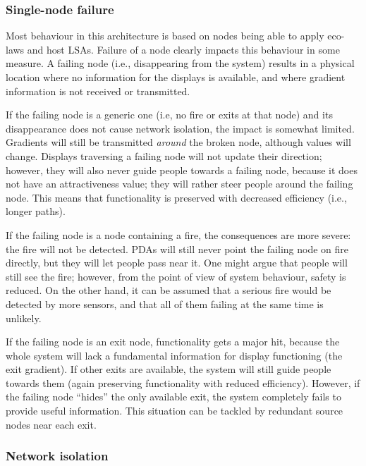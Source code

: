 \documentclass[12pt,a4paper,twoside,openright]{book}
\begin{document}
\subsubsection{Single-node failure}

Most behaviour in this architecture is based on nodes being able to apply eco-laws and host LSAs.
%
Failure of a node clearly impacts this behaviour in some measure. A failing node (i.e., disappearing from the system) results in a physical location where no information for the displays is available, and where gradient information is not received or transmitted. 

If the failing node is a generic one (i.e, no fire or exits at that node) and its disappearance does not cause network isolation, the impact is somewhat limited.
%
Gradients will still be transmitted \emph{around} the broken node, although values will change.
%
Displays traversing a failing node will not update their direction; however, they will also never guide people towards a failing node, because it does not have an attractiveness value; they will rather steer people around the failing node.
%
This means that functionality is preserved with decreased efficiency (i.e., longer paths).

If the failing node is a node containing a fire, the consequences are more severe: the fire will not be detected.
%
PDAs will still never point the failing node on fire directly, but they will let people pass near it. One might argue that people will still see the fire; however, from the point of view of system behaviour, safety is reduced.
%
On the other hand, it can be  assumed that a serious fire would be detected by more sensors, and that  all of them failing at the same time is unlikely.

If the failing node is an exit node, functionality gets a major hit, because the whole system will lack a fundamental information for display functioning (the exit gradient).
%
If other exits are available, the system will still guide people towards them (again preserving functionality with reduced efficiency).
%
However, if the failing node ``hides'' the only available exit, the system completely fails to provide useful information.
%
This situation can be tackled by redundant source nodes near each exit.

\subsubsection{Network isolation}
\end{document}
